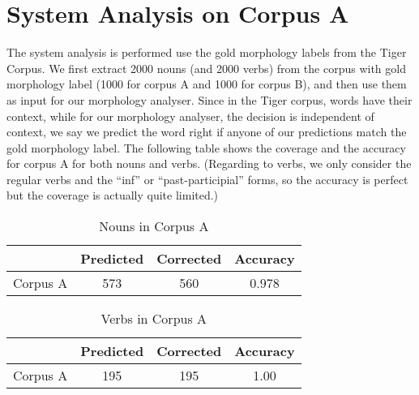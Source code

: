 \documentclass[11pt,letterpaper]{article}
\begin{document}
\section{System Analysis on Corpus A}
The system analysis is performed use the gold morphology labels from the Tiger Corpus. We first extract 2000 nouns (and 2000 verbs) from the corpus with gold morphology label (1000 for corpus A and 1000 for corpus B), and then use them as input for our morphology analyser. Since in the Tiger corpus, words have their context, while for our morphology analyser, the decision is independent of context, we say we predict the word right if anyone of our predictions match the gold morphology label. The following table shows the coverage and the accuracy for corpus A for both nouns and verbs. (Regarding to verbs, we only consider the regular verbs and the ``inf'' or ``past-participial'' forms, so the accuracy is perfect but the coverage is actually quite limited.)
\begin{table}[h]
\begin{center}
\begin{tabular}{|c|ccc|}
\hline 
 & Predicted & Corrected & Accuracy \\ 
\hline 
Corpus A & 573 & 560 & 0.978 \\ 
\hline 
\end{tabular}
\end{center}
\caption{Nouns in Corpus A}
\end{table}

\begin{table}[h]
\begin{center}
\begin{tabular}{|c|ccc|}
\hline 
 & Predicted & Corrected & Accuracy \\ 
\hline 
Corpus A & 195 & 195 & 1.00 \\ 
\hline 
\end{tabular} 
\end{center}
\caption{Verbs in Corpus A}
\end{table}
\end{document}

